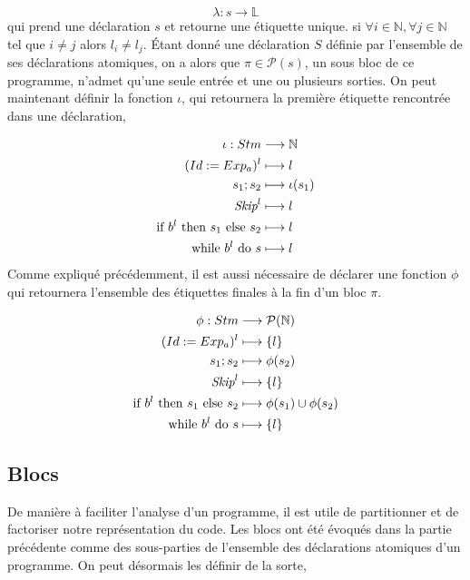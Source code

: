\documentclass[a4paper, 12pt]{article}
\begin{document}
\[
	\lambda: s \longrightarrow \mathbb{L}
\]
\newline
qui prend une déclaration $s$ et retourne une étiquette unique.
\newline
\newline
{}
si $\forall i \in \mathbb{N}, \forall j \in \mathbb{N}$ tel que $i \ne j$ alors $l_i \ne l_j$.
\newline
\newline
Étant donné une déclaration $S$ définie par l'ensemble de ses déclarations atomiques, on a alors que 
$\pi \in \mathcal{P}(s)$, un sous bloc de ce programme, n'admet qu'une seule entrée et une ou plusieurs sorties. 
On peut maintenant définir la fonction $\iota$, qui retournera la première étiquette rencontrée dans une déclaration,

\begin{align*}
	\iota : Stm &\longrightarrow \mathbb{N}\\
	({Id}\space:=\space{Exp_a})^l &\longmapsto l\\
	{s_1}\space;\space{s_2} &\longmapsto \iota(s_1)\\
	{\textit{Skip}}^l &\longmapsto l\\
	\text{if }{b^l}\text{ then }{s_1}\text{ else }{s_2} &\longmapsto l\\
	\text{while }{b^l}\text{ do }{s} &\longmapsto l
\end{align*}
Comme expliqué précédemment, il est aussi nécessaire de déclarer une fonction $\phi$ qui retournera l'ensemble des étiquettes finales 
à la fin d'un bloc $\pi$.

\begin{align*}
	\phi : Stm &\longrightarrow \mathcal{P}(\mathbb{N})\\
	({Id}\space:=\space{Exp_a})^l &\longmapsto \{l\}\\
	{s_1}\space;\space{s_2} &\longmapsto \phi(s_2)\\
	\textit{Skip}^l &\longmapsto \{l\}\\
	\text{if }{b^l}\text{ then }{s_1}\text{ else }{s_2} &\longmapsto \phi(s_1) \cup \phi(s_2)\\
	\text{while }{b^l}\text{ do }{s} &\longmapsto \{l\}
\end{align*}
\subsection{Blocs}
De manière à faciliter l'analyse d'un programme, il est utile de partitionner et de factoriser notre représentation du code. 
Les blocs ont été évoqués dans la partie précédente comme des sous-parties de l'ensemble des déclarations atomiques d'un programme. 
On peut désormais les définir de la sorte,
\end{document}
